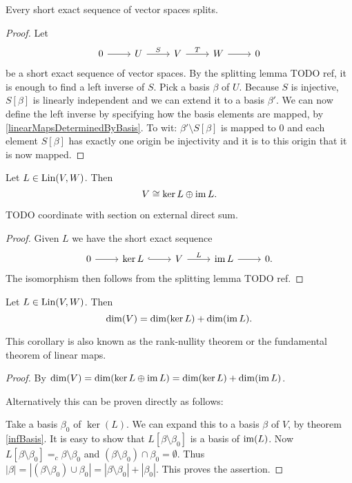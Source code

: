 \begin{theorem}
Every short exact sequence of vector spaces splits.
\end{theorem}
\begin{proof}
Let
\[ \begin{tikzcd}
0 \rar & U \rar{S} & V \rar{T} & W \rar & 0
\end{tikzcd} \]
be a short exact sequence of vector spaces.
By the splitting lemma TODO ref, it is enough to find a left inverse of $S$. Pick a basis $\beta$ of $U$. Because $S$ is injective, $S[\beta]$ is linearly independent and we can extend it to a basis $\beta'$. We can now define the left inverse by specifying how the basis elements are mapped, by \ref{linearMapsDeterminedByBasis}. To wit: $\beta'\setminus S[\beta]$ is mapped to $0$ and each element $S[\beta]$ has exactly one origin be injectivity and it is to this origin that it is now mapped.
\end{proof}
\begin{corollary} \label{directSumKernelImage}
Let $L \in \operatorname{Lin}(V,W)$. Then
\[ V \cong \ker L \oplus \operatorname{im} L. \]
\end{corollary}
TODO coordinate with section on external direct sum.
\begin{proof}
Given $L$ we have the short exact sequence
\[ \begin{tikzcd}
0 \rar & \ker L \ar[r, hook] & V \rar{L} & \im L \rar & 0.
\end{tikzcd} \]
The isomorphism then follows from the splitting lemma TODO ref.
\end{proof}
\begin{corollary} \label{dimensionLinearMaps}
Let $L \in \operatorname{Lin}(V,W)$. Then
\[ \dim(V) = \dim(\ker L) + \dim(\operatorname{im} L). \]
\end{corollary}
This corollary is also known as the rank-nullity theorem or the fundamental theorem of linear maps.
\begin{proof}
By $\dim(V) = \dim(\ker L \oplus \operatorname{im} L) = \dim(\ker L) + \dim(\operatorname{im} L)$.

Alternatively this can be proven directly as follows:

Take a basis $\beta_0$ of $\ker(L)$. We can expand this to a basis $\beta$ of $V$, by theorem \ref{infBasis}. It is easy to show that $L[\beta\setminus \beta_0]$ is a basis of $\operatorname{im}(L)$. Now $L[\beta\setminus \beta_0] =_c \beta\setminus \beta_0$ and $(\beta\setminus \beta_0) \cap \beta_0 = \emptyset$. Thus $|\beta| = |(\beta\setminus \beta_0) \cup \beta_0| = |\beta\setminus \beta_0| + |\beta_0|$. This proves the assertion.
\end{proof}
